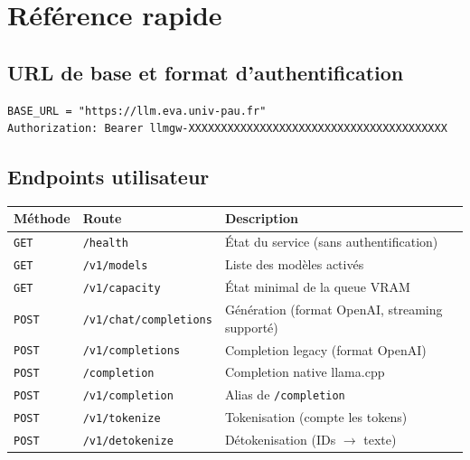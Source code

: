 \documentclass[12pt, a4paper, twoside]{article}
\begin{document}
\section{Référence rapide}
\label{sec:reference}

\subsection{URL de base et format d'authentification}

\begin{lstlisting}[style=bashstyle]
BASE_URL = "https://llm.eva.univ-pau.fr"
Authorization: Bearer llmgw-XXXXXXXXXXXXXXXXXXXXXXXXXXXXXXXXXXXXXXXX
\end{lstlisting}

\subsection{Endpoints utilisateur}

\begin{center}
\small
\begin{tabular}{L{2cm} L{5.5cm} L{6cm}}
  \toprule
  \textbf{Méthode} & \textbf{Route} & \textbf{Description} \\
  \midrule
  \texttt{GET}  & \texttt{/health}                & État du service (sans authentification) \\
  \texttt{GET}  & \texttt{/v1/models}             & Liste des modèles activés \\
  \texttt{GET}  & \texttt{/v1/capacity}           & État minimal de la queue VRAM \\
  \texttt{POST} & \texttt{/v1/chat/completions}   & Génération (format OpenAI, streaming supporté) \\
  \texttt{POST} & \texttt{/v1/completions}        & Completion legacy (format OpenAI) \\
  \texttt{POST} & \texttt{/completion}            & Completion native llama.cpp \\
  \texttt{POST} & \texttt{/v1/completion}         & Alias de \texttt{/completion} \\
  \texttt{POST} & \texttt{/v1/tokenize}           & Tokenisation (compte les tokens) \\
  \texttt{POST} & \texttt{/v1/detokenize}         & Détokenisation (IDs $\to$ texte) \\
  \bottomrule
\end{tabular}
\end{center}
\end{document}
